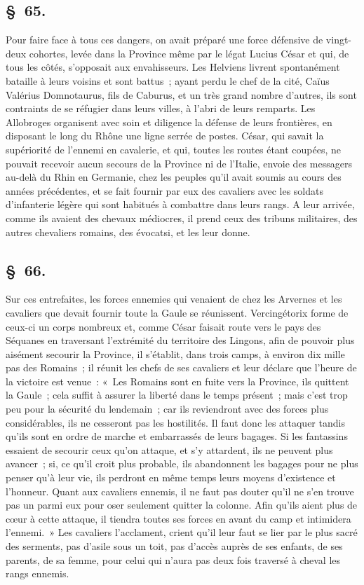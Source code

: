 \documentclass[french,twoside]{book} %
\begin{document}
\subsection[{§ 65.}]{ \textsc{§ 65.} }
\noindent Pour faire face à tous ces dangers, on avait préparé une force défensive de vingt-deux cohortes, levée dans la Province même par le légat Lucius César et qui, de tous les côtés, s’opposait aux envahisseurs. Les Helviens livrent spontanément bataille à leurs voisins et sont battus ; ayant perdu le chef de la cité, Caïus Valérius Domnotaurus, fils de Caburus, et un très grand nombre d’autres, ils sont contraints de se réfugier dans leurs villes, à l’abri de leurs remparts. Les Allobroges organisent avec soin et diligence la défense de leurs frontières, en disposant le long du Rhône une ligne serrée de postes. César, qui savait la supériorité de l’ennemi en cavalerie, et qui, toutes les routes étant coupées, ne pouvait recevoir aucun secours de la Province ni de l’Italie, envoie des messagers au-delà du Rhin en Germanie, chez les peuples qu’il avait soumis au cours des années précédentes, et se fait fournir par eux des cavaliers avec les soldats d’infanterie légère qui sont habitués à combattre dans leurs rangs. A leur arrivée, comme ils avaient des chevaux médiocres, il prend ceux des tribuns militaires, des autres chevaliers romains, des évocatsi, et les leur donne.
\subsection[{§ 66.}]{ \textsc{§ 66.} }
\noindent Sur ces entrefaites, les forces ennemies qui venaient de chez les Arvernes et les cavaliers que devait fournir toute la Gaule se réunissent. Vercingétorix forme de ceux-ci un corps nombreux et, comme César faisait route vers le pays des Séquanes en traversant l’extrémité du territoire des Lingons, afin de pouvoir plus aisément secourir la Province, il s’établit, dans trois camps, à environ dix mille pas des Romains ; il réunit les chefs de ses cavaliers et leur déclare que l’heure de la victoire est venue : « Les Romains sont en fuite vers la Province, ils quittent la Gaule ; cela suffit à assurer la liberté dans le temps présent ; mais c’est trop peu pour la sécurité du lendemain ; car ils reviendront avec des forces plus considérables, ils ne cesseront pas les hostilités. Il faut donc les attaquer tandis qu’ils sont en ordre de marche et embarrassés de leurs bagages. Si les fantassins essaient de secourir ceux qu’on attaque, et s’y attardent, ils ne peuvent plus avancer ; si, ce qu’il croit plus probable, ils abandonnent les bagages pour ne plus penser qu’à leur vie, ils perdront en même temps leurs moyens d’existence et l’honneur. Quant aux cavaliers ennemis, il ne faut pas douter qu’il ne s’en trouve pas un parmi eux pour oser seulement quitter la colonne. Afin qu’ils aient plus de cœur à cette attaque, il tiendra toutes ses forces en avant du camp et intimidera l’ennemi. » Les cavaliers l’acclament, crient qu’il leur faut se lier par le plus sacré des serments, pas d’asile sous un toit, pas d’accès auprès de ses enfants, de ses parents, de sa femme, pour celui qui n’aura pas deux fois traversé à cheval les rangs ennemis.
\end{document}
